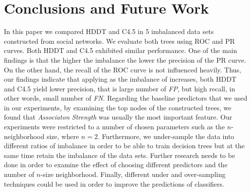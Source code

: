 \documentclass{acm_proc_article-sp}
\begin{document}
\section{Conclusions and Future Work}
\label{Sect.7}
In this paper we compared HDDT and C4.5 in 5 imbalanced data sets constructed from social networks. We evaluate both trees using ROC and PR curves. Both HDDT and C4.5 exhibited similar performance. One of the main findings is that the higher the imbalance the lower the precision of the PR curve. On the other hand, the recall of the ROC curve is not influenced heavily. Thus, our findings indicate that applying as the imbalance of increases, both HDDT and C4.5 yield lower precision, that is large number of \textit{FP}, but high recall, in other words, small number of \textit{FN}. Regarding the baseline predictors that we used in our experiments, by examining the top nodes of the constructed trees, we found that \textit{Associaton Strength} was usually the most important feature. Our experiments were restricted to a number of chosen parameters such as the $n$-neighborhood size, where $n=2$. Furthermore, we under-sample the data into different ratios of imbalance in order to be able to train decision trees but at the same time retain the imbalance of the data sets. Further research needs to be done in order to examine the effect of choosing different predictors and the number of $n$-size neighborhood. Finally, different under and over-sampling techniques could be used in order to improve the predictions of classifiers.


\end{document}

